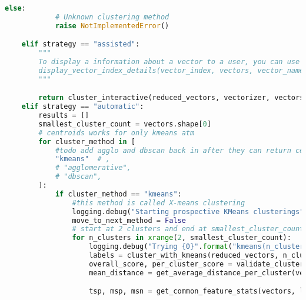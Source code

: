 \begin{lstlisting}[language=python]
        else:
            # Unknown clustering method
            raise NotImplementedError()

    elif strategy == "assisted":
        """
        To display a information about a vector to a user, you can use the following:
        display_vector_index_details(vector_index, vectors, vector_names, vectorizer)
        """

        return cluster_interactive(reduced_vectors, vectorizer, vectors, vector_names)
    elif strategy == "automatic":
        results = []
        smallest_cluster_count = vectors.shape[0]
        # centroids works for only kmeans atm
        for cluster_method in [
            #todo add agglo and dbscan back in after they can return centroids.
            "kmeans"  # ,
            # "agglomerative",
            # "dbscan",
        ]:
            if cluster_method == "kmeans":
                #this method is called X-means clustering
                logging.debug("Starting prospective KMeans clusterings")
                move_to_next_method = False
                # start at 2 clusters and end at smallest_cluster_count
                for n_clusters in xrange(2, smallest_cluster_count):
                    logging.debug("Trying {0}".format("kmeans(n_clusters={0})".format(n_clusters)))
                    labels = cluster_with_kmeans(reduced_vectors, n_clusters=n_clusters)
                    overall_score, per_cluster_score = validate_clusters(vectors, labels)
                    mean_distance = get_average_distance_per_cluster(vectors, labels)[0]

                    tsp, msp, msn = get_common_feature_stats(vectors, labels, vectorizer)


\end{lstlisting}
